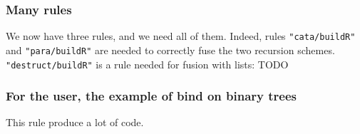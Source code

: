 \subsubsection{Many rules}
We now have three rules, and we need all of them. Indeed, rules \verb|"cata/buildR"| and \verb|"para/buildR"| are needed to correctly fuse the two recursion schemes. \verb|"destruct/buildR"| is a rule needed for fusion with lists:
TODO

\subsubsection{For the user, the example of bind on binary trees}
This rule produce a lot of code.

